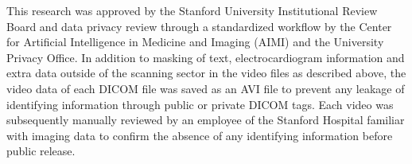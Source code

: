 This research was approved by the Stanford University Institutional Review Board and data privacy review through a standardized workflow by the Center for Artificial Intelligence in Medicine and Imaging (AIMI) and the University Privacy Office. In addition to masking of text, electrocardiogram information and extra data outside of the scanning sector in the video files as described above, the video data of each DICOM file was saved as an AVI file to prevent any leakage of identifying information through public or private DICOM tags. Each video was subsequently manually reviewed by an employee of the Stanford Hospital familiar with imaging data to confirm the absence of any identifying information before public release.
